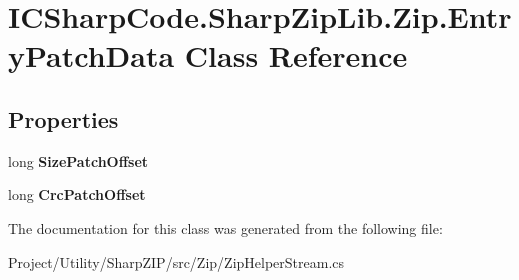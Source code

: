 \hypertarget{class_i_c_sharp_code_1_1_sharp_zip_lib_1_1_zip_1_1_entry_patch_data}{}\section{I\+C\+Sharp\+Code.\+Sharp\+Zip\+Lib.\+Zip.\+Entry\+Patch\+Data Class Reference}
\label{class_i_c_sharp_code_1_1_sharp_zip_lib_1_1_zip_1_1_entry_patch_data}
\subsection*{Properties}
\begin{DoxyCompactItemize}
\item 
\mbox{\label{class_i_c_sharp_code_1_1_sharp_zip_lib_1_1_zip_1_1_entry_patch_data_a9284c8919e3da26e48b328d86ad3aa07}} 
long {\bfseries Size\+Patch\+Offset}
\item 
\mbox{\label{class_i_c_sharp_code_1_1_sharp_zip_lib_1_1_zip_1_1_entry_patch_data_a9100dab176b64262328eb3826a934ee5}} 
long {\bfseries Crc\+Patch\+Offset}
\end{DoxyCompactItemize}


The documentation for this class was generated from the following file\+:\begin{DoxyCompactItemize}
\item 
Project/\+Utility/\+Sharp\+Z\+I\+P/src/\+Zip/Zip\+Helper\+Stream.\+cs\end{DoxyCompactItemize}
